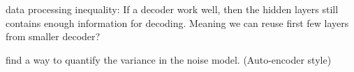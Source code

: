 data processing inequality: If a decoder work well, then the hidden layers still contains enough information for decoding. Meaning we can reuse first few layers from smaller decoder?

find a way to quantify the variance in the noise model. (Auto-encoder style)